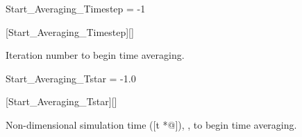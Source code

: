 
\begin{nmldescitem}
Start_Averaging_Timestep = -1
\end{nmldescitem}
[Start\_Averaging\_Timestep][]

\begin{nmldescbody}
Iteration number to begin time averaging.
\end{nmldescbody}


\begin{nmldescitem}
Start_Averaging_Tstar = -1.0
\end{nmldescitem}
[Start\_Averaging\_Tstar][]

\begin{nmldescbody}
Non-dimensional simulation time ([t *@\tstar]),
,
to begin time averaging.
\end{nmldescbody}


